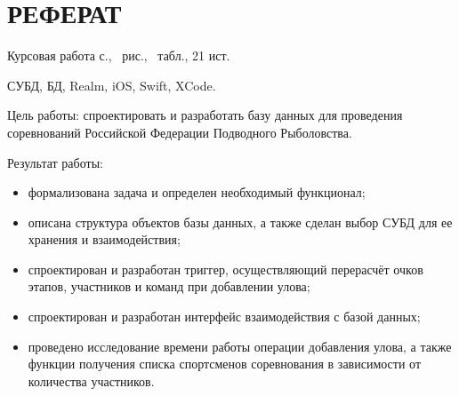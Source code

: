 \section*{РЕФЕРАТ}

Курсовая работа \pageref{LastPage} с., \totalfigures\ рис., \totaltables\ табл., 21 ист.

СУБД, БД, Realm, iOS, Swift, XCode.

Цель работы: спроектировать и разработать базу данных для проведения соревнований Российской Федерации Подводного Рыболовства.

Результат работы: 
\begin{itemize}[label=---]
	\item формализована задача и определен необходимый функционал;
	\item описана структура объектов базы данных, а также сделан выбор СУБД для ее хранения и взаимодействия;
	\item спроектирован и разработан триггер, осуществляющий перерасчёт очков этапов, участников и команд при добавлении улова;
	\item спроектирован и разработан интерфейс взаимодействия с базой данных;
	\item проведено исследование времени работы операции добавления улова, а также функции получения списка спортсменов соревнования в зависимости от количества участников.
\end{itemize}

\pagebreak